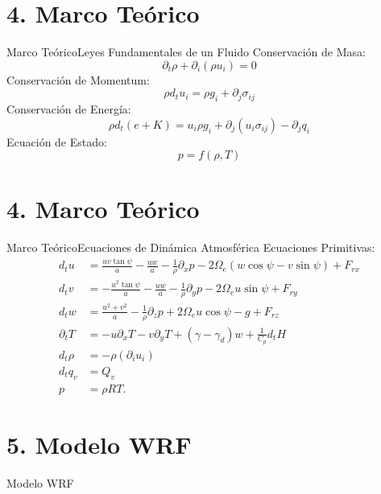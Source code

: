 \documentclass[mathserif]{beamer}
\newcommand{\be}{\begin{equation}}
\newcommand{\ee}{\end{equation}}
\begin{document}
\section{4. Marco Teórico}
\begin{frame}{Marco Teórico}{Leyes Fundamentales de un Fluido}
	Conservación de Masa:
	\be \partial_t \rho + \partial_i(\rho u_i) = 0 \ee
	Conservación de Momentum:
	\be \rho d_t u_i = \rho g_i + \partial_j\sigma_{ij} \ee
	Conservación de Energía:
	\be \rho d_t\left( e+ K \right) = u_i\rho g_i + \partial_j(u_i \sigma_{ij}) - \partial_j q_i \ee
	Ecuación de Estado:
	\be p = f(\rho,T) \ee
\end{frame}

\section{4. Marco Teórico}
\begin{frame}{Marco Teórico}{Ecuaciones de Dinámica Atmosférica}
Ecuaciones Primitivas:
\small
	\begin{align}
	d_t u &= \frac{uv\tan\psi}{a}-\frac{uw}{a}-\frac{1}{\rho}\partial_x p - 2\Omega_e(w\cos\psi - v\sin\psi) + F_{rx}\\
	d_t v &= -\frac{u^2\tan\psi}{a}-\frac{uw}{a}-\frac{1}{\rho}\partial_y p - 2\Omega_e u\sin\psi + F_{ry}\\
	d_t w &= \frac{u^2 + v^2}{a}-\frac{1}{\rho}\partial_z p + 2\Omega_e u\cos\psi -g + F_{rz}\\
	\partial_t T &= -u\partial_x T -v\partial_y T + (\gamma-\gamma_d)w+\frac{1}{C_p}d_t H\\
	d_t \rho &= -\rho(\partial_i u_i)\\
	d_t q_v &= Q_v\label{03_eq:humedad}\\
	p &= \rho R T.
	\end{align}
\normalsize
\end{frame}



















\section{5. Modelo WRF}
\begin{frame}{Modelo WRF}
\end{frame}
\end{document}
